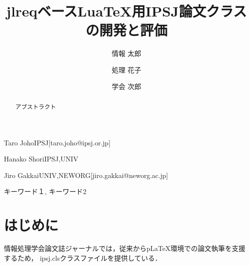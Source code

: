 \documentclass[submit]{ipsj-luatex}
\begin{document}
\title{{jlreqベースLuaTeX用IPSJ論文クラスの開発と評価}}




\author{情報 太郎}{Taro Joho}{IPSJ}[taro.joho@ipsj.or.jp]
\author{処理 花子}{Hanako Shori}{IPSJ,UNIV}
\author{学会 次郎}{Jiro Gakkai}{UNIV,NEWORG}[jiro.gakkai@neworg.ac.jp]
\maketitle

\begin{abstract}
アブストラクト
\end{abstract}


\begin{jkeyword}
キーワード１, キーワード2
\end{jkeyword}


\section{はじめに}

情報処理学会論文誌ジャーナルでは，従来からpLaTeX環境での論文執筆を支援するため，
ipsj.clsクラスファイルを提供している．
\end{document}
